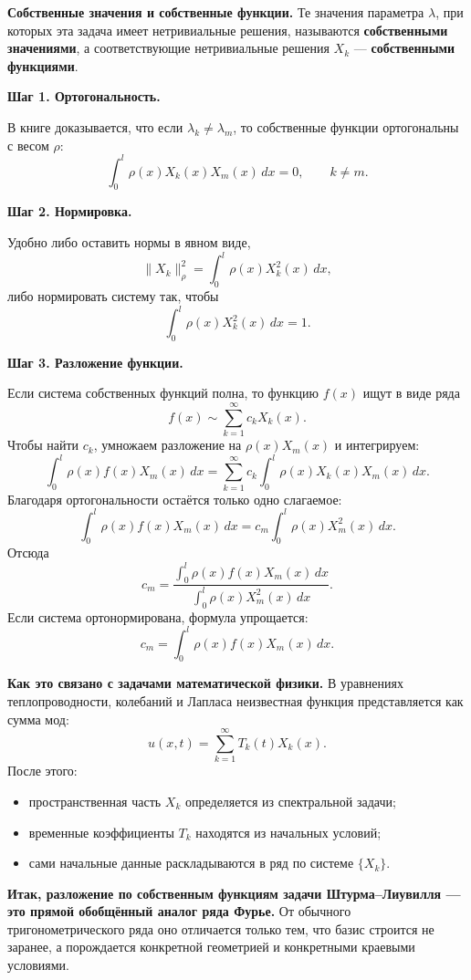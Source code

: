 \documentclass[a4paper,12pt]{article}
\begin{document}
\textbf{Собственные значения и собственные функции.}
Те значения параметра $\lambda$, при которых эта задача имеет нетривиальные решения, называются \textbf{собственными значениями}, а соответствующие нетривиальные решения $X_k$ --- \textbf{собственными функциями}.

\textbf{Шаг 1. Ортогональность.}

В книге доказывается, что если $\lambda_k\ne \lambda_m$, то собственные функции ортогональны с весом $\rho$:
\[
\int_0^l \rho(x)X_k(x)X_m(x)\,dx=0,
\qquad
k\ne m.
\]

\textbf{Шаг 2. Нормировка.}

Удобно либо оставить нормы в явном виде,
\[
\|X_k\|_\rho^2=\int_0^l \rho(x)X_k^2(x)\,dx,
\]
либо нормировать систему так, чтобы
\[
\int_0^l \rho(x)X_k^2(x)\,dx=1.
\]

\textbf{Шаг 3. Разложение функции.}

Если система собственных функций полна, то функцию $f(x)$ ищут в виде ряда
\[
f(x)\sim \sum_{k=1}^{\infty} c_k X_k(x).
\]
Чтобы найти $c_k$, умножаем разложение на $\rho(x)X_m(x)$ и интегрируем:
\[
\int_0^l \rho(x)f(x)X_m(x)\,dx
=
\sum_{k=1}^{\infty} c_k
\int_0^l \rho(x)X_k(x)X_m(x)\,dx.
\]
Благодаря ортогональности остаётся только одно слагаемое:
\[
\int_0^l \rho(x)f(x)X_m(x)\,dx
=
c_m\int_0^l \rho(x)X_m^2(x)\,dx.
\]
Отсюда
\[
c_m=
\frac{\displaystyle \int_0^l \rho(x)f(x)X_m(x)\,dx}
{\displaystyle \int_0^l \rho(x)X_m^2(x)\,dx}.
\]
Если система ортонормирована, формула упрощается:
\[
c_m=\int_0^l \rho(x)f(x)X_m(x)\,dx.
\]

\textbf{Как это связано с задачами математической физики.}
В уравнениях теплопроводности, колебаний и Лапласа неизвестная функция представляется как сумма мод:
\[
u(x,t)=\sum_{k=1}^{\infty}T_k(t)X_k(x).
\]
После этого:
\begin{itemize}
  \item пространственная часть $X_k$ определяется из спектральной задачи;
  \item временные коэффициенты $T_k$ находятся из начальных условий;
  \item сами начальные данные раскладываются в ряд по системе $\{X_k\}$.
\end{itemize}

\textbf{Итак, разложение по собственным функциям задачи Штурма--Лиувилля --- это прямой обобщённый аналог ряда Фурье.}
От обычного тригонометрического ряда оно отличается только тем, что базис строится не заранее, а порождается конкретной геометрией и конкретными краевыми условиями.
\end{document}
